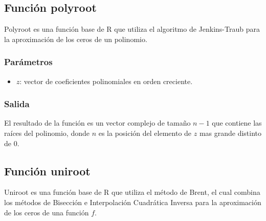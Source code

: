 \documentclass[a4paper,12pt]{article}
\begin{document}

\subsection{Función polyroot}

Polyroot es una función base de R que utiliza el algoritmo de Jenkins-Traub para la aproximación de los ceros de un polinomio.

\par

\subsubsection{Parámetros}
\begin{itemize}
    \item $z$: vector de coeficientes polinomiales en orden creciente.
\end{itemize}
 
\subsubsection{Salida}

El resultado de la función es un vector complejo de tamaño $n-1$ que contiene las raíces del polinomio, donde $n$ es la posición del elemento de $z$ mas grande distinto de $0$.


\subsection{Función uniroot}
Uniroot es una función base de R que utiliza el método de Brent, el cual combina los métodos de Bisección e Interpolación Cuadrática Inversa para la aproximación de los ceros de una función $f$.
\par 
\end{document}
